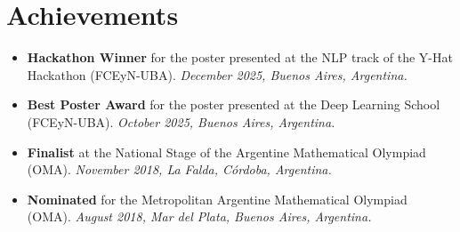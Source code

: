 \documentclass[letterpaper,11pt]{article}
\newcommand{\resumeEvent}[1]{
  \item
  \textnormal{#1}\vspace{-7pt}
}
\newcommand{\resumeSectionStart}{\begin{itemize}[leftmargin=0pt, label={}]}
\newcommand{\resumeSectionEnd}{\end{itemize}}
\begin{document}
\section{Achievements}
  \resumeSectionStart
    \resumeEvent
      {\textbf{Hackathon Winner} for the poster presented at the NLP track of the Y-Hat Hackathon (FCEyN-UBA). \textit{December 2025, Buenos Aires, Argentina.}}
    \resumeEvent
      {\textbf{Best Poster Award} for the poster presented at the Deep Learning School (FCEyN-UBA). \textit{October 2025, Buenos Aires, Argentina.}}
    \resumeEvent
      {\textbf{Finalist} at the National Stage of the Argentine Mathematical Olympiad (OMA). \textit{November 2018, La Falda, Córdoba, Argentina.}}
    \resumeEvent
      {\textbf{Nominated} for the Metropolitan Argentine Mathematical Olympiad (OMA). \textit{August 2018, Mar del Plata, Buenos Aires, Argentina.}}
  \resumeSectionEnd
\end{document}
